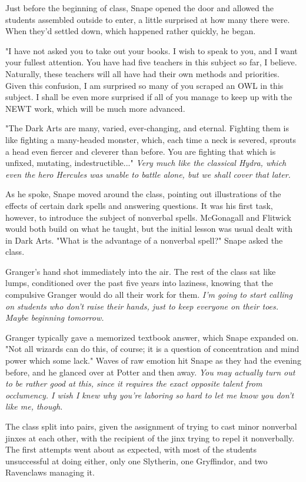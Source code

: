 \documentclass[a4paper,11pt]{article}
\begin{document}
Just before the beginning of class, Snape opened the door and allowed the students assembled outside to enter, a little surprised at how many there were. When they'd settled down, which happened rather quickly, he began.

"I have not asked you to take out your books. I wish to speak to you, and I want your fullest attention. You have had five teachers in this subject so far, I believe. Naturally, these teachers will all have had their own methods and priorities. Given this confusion, I am surprised so many of you scraped an OWL in this subject. I shall be even more surprised if all of you manage to keep up with the NEWT work, which will be much more advanced.

"The Dark Arts are many, varied, ever-changing, and eternal. Fighting them is like fighting a many-headed monster, which, each time a neck is severed, sprouts a head even fiercer and cleverer than before. You are fighting that which is unfixed, mutating, indestructible..." \emph{Very much like the classical Hydra, which even the hero Hercules was unable to battle alone, but we shall cover that later.}

As he spoke, Snape moved around the class, pointing out illustrations of the effects of certain dark spells and answering questions. It was his first task, however, to introduce the subject of nonverbal spells. McGonagall and Flitwick would both build on what he taught, but the initial lesson was usual dealt with in Dark Arts. "What is the advantage of a nonverbal spell?" Snape asked the class.

Granger's hand shot immediately into the air. The rest of the class sat like lumps, conditioned over the past five years into laziness, knowing that the compulsive Granger would do all their work for them. \emph{I'm going to start calling on students who don't raise their hands, just to keep everyone on their toes. Maybe beginning tomorrow.}

Granger typically gave a memorized textbook answer, which Snape expanded on. "Not all wizards can do this, of course; it is a question of concentration and mind power which some lack." Waves of raw emotion hit Snape as they had the evening before, and he glanced over at Potter and then away. \emph{You may actually turn out to be rather good at this, since it requires the exact opposite talent from occlumency. I wish I knew why you're laboring so hard to let me know you don't like me, though.}

The class split into pairs, given the assignment of trying to cast minor nonverbal jinxes at each other, with the recipient of the jinx trying to repel it nonverbally. The first attempts went about as expected, with most of the students unsuccessful at doing either, only one Slytherin, one Gryffindor, and two Ravenclaws managing it.
\end{document}
